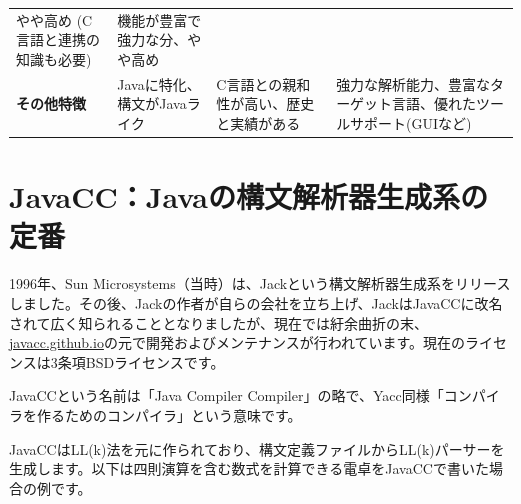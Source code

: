 \begin{longtable}[]{@{}llll@{}}
\begin{minipage}[t]{0.22\columnwidth}
やや高め (C言語と連携の知識も必要)\strut
\end{minipage} & \begin{minipage}[t]{0.32\columnwidth}\raggedright
機能が豊富で強力な分、やや高め\strut
\end{minipage}\tabularnewline
\begin{minipage}[t]{0.14\columnwidth}\raggedright
\textbf{その他特徴}\strut
\end{minipage} & \begin{minipage}[t]{0.20\columnwidth}\raggedright
Javaに特化、構文がJavaライク\strut
\end{minipage} & \begin{minipage}[t]{0.22\columnwidth}\raggedright
C言語との親和性が高い、歴史と実績がある\strut
\end{minipage} & \begin{minipage}[t]{0.32\columnwidth}\raggedright
強力な解析能力、豊富なターゲット言語、優れたツールサポート(GUIなど)\strut
\end{minipage}\tabularnewline
\bottomrule
\end{longtable}

\hypertarget{chapter6-javaccjavaux306eux69cbux6587ux89e3ux6790ux5668ux751fux6210ux7cfbux306eux5b9aux756a}{%
\section{JavaCC：Javaの構文解析器生成系の定番}\label{chapter6-javaccjavaux306eux69cbux6587ux89e3ux6790ux5668ux751fux6210ux7cfbux306eux5b9aux756a}}

1996年、Sun
Microsystems（当時）は、Jackという構文解析器生成系をリリースしました。その後、Jackの作者が自らの会社を立ち上げ、JackはJavaCCに改名されて広く知られることとなりましたが、現在では紆余曲折の末、\href{https://javacc.github.io/javacc}{javacc.github.io}の元で開発およびメンテナンスが行われています。現在のライセンスは3条項BSDライセンスです。

JavaCCという名前は「Java Compiler
Compiler」の略で、Yacc同様「コンパイラを作るためのコンパイラ」という意味です。

JavaCCはLL(k)法を元に作られており、構文定義ファイルからLL(k)パーサーを生成します。以下は四則演算を含む数式を計算できる電卓をJavaCCで書いた場合の例です。

